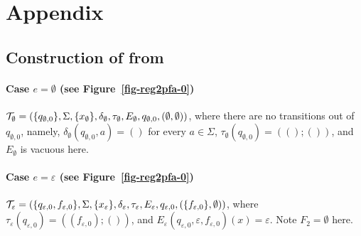 
\section{Appendix}

\subsection{Construction of {\PSST} from {\regexp}}

\paragraph{Case $e =\emptyset$ (see Figure~\ref{fig-reg2pfa-0})} $\mathcal{T}_\emptyset = (\{q_{\emptyset, 0}\}, \Sigma, \{x_{\emptyset}\}, \delta_\emptyset, \tau_\emptyset, E_\emptyset, q_{\emptyset, 0}, (\emptyset, \emptyset))$, where there are no transitions out of $q_{\emptyset,0}$, namely, $\delta_\emptyset(q_{\emptyset, 0}, a) = ()$ for every $a \in \Sigma$, $\tau_\emptyset(q_{\emptyset, 0}) = ((); ())$, and $E_\emptyset$ is vacuous here.


\paragraph{Case $e = \varepsilon$ (see Figure~\ref{fig-reg2pfa-0})} $\mathcal{T}_\varepsilon = (\{q_{\varepsilon, 0}, f_{\varepsilon,0}\}, \Sigma, \{x_\varepsilon\}, \delta_\varepsilon, \tau_\varepsilon, E_\varepsilon, q_{\varepsilon,0}, (\{f_{\varepsilon,0}\}, \emptyset))$, 
%
where 
$\tau_\varepsilon(q_{\varepsilon,0}) = ((f_{\varepsilon,0}); ())$, %
and $E_\varepsilon(q_{\varepsilon,0}, \varepsilon, f_{\varepsilon,0})(x) = \varepsilon$. Note $F_2 = \emptyset$ here. 


